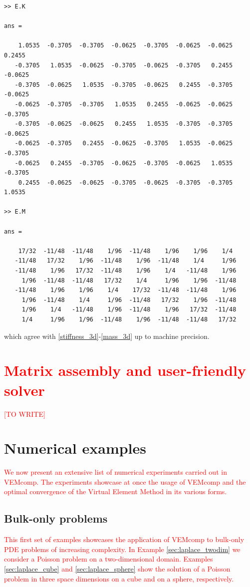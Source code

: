 \documentclass[a4paper]{article}
\newcommand{\red}[1]{\textcolor{red}{#1}}
\begin{document}
\begin{lstlisting}
>> E.K

ans =

    1.0535  -0.3705  -0.3705  -0.0625  -0.3705  -0.0625  -0.0625   0.2455
   -0.3705   1.0535  -0.0625  -0.3705  -0.0625  -0.3705   0.2455  -0.0625
   -0.3705  -0.0625   1.0535  -0.3705  -0.0625   0.2455  -0.3705  -0.0625
   -0.0625  -0.3705  -0.3705   1.0535   0.2455  -0.0625  -0.0625  -0.3705
   -0.3705  -0.0625  -0.0625   0.2455   1.0535  -0.3705  -0.3705  -0.0625
   -0.0625  -0.3705   0.2455  -0.0625  -0.3705   1.0535  -0.0625  -0.3705
   -0.0625   0.2455  -0.3705  -0.0625  -0.3705  -0.0625   1.0535  -0.3705
    0.2455  -0.0625  -0.0625  -0.3705  -0.0625  -0.3705  -0.3705   1.0535
      
>> E.M

ans =

    17/32  -11/48  -11/48    1/96  -11/48    1/96    1/96    1/4
   -11/48   17/32    1/96  -11/48    1/96  -11/48    1/4     1/96
   -11/48    1/96   17/32  -11/48    1/96    1/4   -11/48    1/96    
     1/96  -11/48  -11/48   17/32    1/4     1/96    1/96  -11/48    
   -11/48    1/96    1/96    1/4    17/32  -11/48  -11/48    1/96    
     1/96  -11/48    1/4     1/96  -11/48   17/32    1/96  -11/48    
     1/96    1/4   -11/48    1/96  -11/48    1/96   17/32  -11/48    
     1/4     1/96    1/96  -11/48    1/96  -11/48  -11/48   17/32  
\end{lstlisting}

\noindent
which agree with \eqref{stiffness_3d}-\eqref{mass_3d} up to machine precision.

\section{\red{Matrix assembly and user-friendly solver}}
\label{sec:user_friendly_solver}
\red{[TO WRITE]}


\section{Numerical examples}
\label{sec:numerical_examples}
\red{We now present an extensive list of numerical experiments carried out in VEMcomp. The experiments showcase at once the usage of VEMcomp and the optimal convergence of the Virtual Element Method in its various forms.}


\subsection{Bulk-only problems}
\red{This first set of examples showcases the application of VEMcomp to bulk-only PDE problems of increasing complexity. In Example \ref{sec:laplace_twodim} we consider a Poisson problem on a two-dimensional domain. Examples \ref{sec:laplace_cube} and \ref{sec:laplace_sphere} show the solution of a Poisson problem in three space dimensions on a cube and on a sphere, respectively.}
\end{document}
